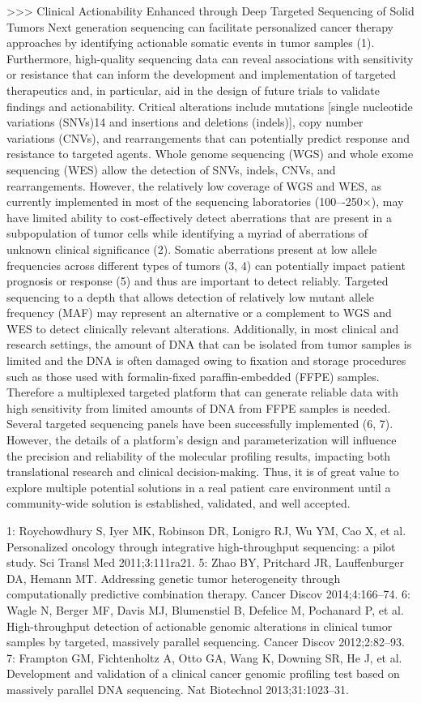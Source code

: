 >>> Clinical Actionability Enhanced through Deep Targeted Sequencing of Solid Tumors
Next generation sequencing can facilitate personalized cancer therapy approaches
by identifying actionable somatic events in tumor samples (1). Furthermore,
high-quality sequencing data can reveal associations with sensitivity or
resistance that can inform the development and implementation of targeted
therapeutics and, in particular, aid in the design of future trials to validate
findings and actionability. Critical alterations include mutations [single
nucleotide variations (SNVs)14 and insertions and deletions (indels)], copy
number variations (CNVs), and rearrangements that can potentially predict
response and resistance to targeted agents. Whole genome sequencing (WGS) and
whole exome sequencing (WES) allow the detection of SNVs, indels, CNVs, and
rearrangements. However, the relatively low coverage of WGS and WES, as
currently implemented in most of the sequencing laboratories (100–-250×), may
have limited ability to cost-effectively detect aberrations that are present in
a subpopulation of tumor cells while identifying a myriad of aberrations of
unknown clinical significance (2). Somatic aberrations present at low allele
frequencies across different types of tumors (3, 4) can potentially impact
patient prognosis or response (5) and thus are important to detect reliably.
Targeted sequencing to a depth that allows detection of relatively low mutant
allele frequency (MAF) may represent an alternative or a complement to WGS and
WES to detect clinically relevant alterations. Additionally, in most clinical
and research settings, the amount of DNA that can be isolated from tumor samples
is limited and the DNA is often damaged owing to fixation and storage procedures
such as those used with formalin-fixed paraffin-embedded (FFPE) samples.
Therefore a multiplexed targeted platform that can generate reliable data with
high sensitivity from limited amounts of DNA from FFPE samples is needed.
Several targeted sequencing panels have been successfully implemented (6, 7).
However, the details of a platform's design and parameterization will influence
the precision and reliability of the molecular profiling results, impacting both
translational research and clinical decision-making. Thus, it is of great value
to explore multiple potential solutions in a real patient care environment until
a community-wide solution is established, validated, and well accepted.

1: Roychowdhury S, Iyer MK, Robinson DR, Lonigro RJ, Wu YM, Cao X, et al. Personalized oncology through integrative high-throughput sequencing: a pilot study. Sci Transl Med 2011;3:111ra21.
5: Zhao BY, Pritchard JR, Lauffenburger DA, Hemann MT. Addressing genetic tumor heterogeneity through computationally predictive combination therapy. Cancer Discov 2014;4:166–74.
6: Wagle N, Berger MF, Davis MJ, Blumenstiel B, Defelice M, Pochanard P, et al. High-throughput detection of actionable genomic alterations in clinical tumor samples by targeted, massively parallel sequencing. Cancer Discov 2012;2:82–93.
7: Frampton GM, Fichtenholtz A, Otto GA, Wang K, Downing SR, He J, et al. Development and validation of a clinical cancer genomic profiling test based on massively parallel DNA sequencing. Nat Biotechnol 2013;31:1023–31.

